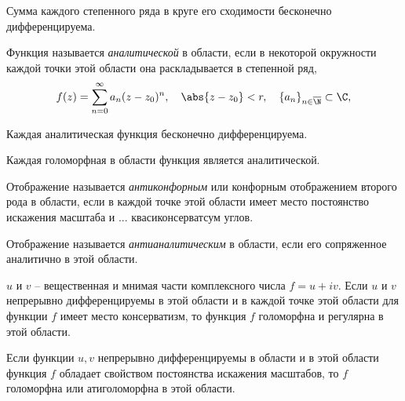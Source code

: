 \begin{corollary}
	Сумма каждого степенного ряда в круге его сходимости бесконечно дифференцируема.
\end{corollary}

\begin{definition}
	Функция называется \emph{аналитической} в области, если в некоторой окружности каждой точки этой области она раскладывается в степенной ряд,
	\[
		f(z) = \sum_{n=0}^{\infty } a_n(z - z_0)^n, \quad \abs{z-z_0} < r, \quad \{a_n\}_{n \in \overline{\N} } \subset \C,
	\]
	\begin{figure}[H]
		\centering
		\label{fig:fig-12}
	\end{figure}
\end{definition}

\begin{corollary}
	Каждая аналитическая функция бесконечно дифференцируема.
\end{corollary}

\begin{remark}
	Каждая голоморфная в области функция является аналитической.
\end{remark}

\begin{definition}
	Отображение называется \emph{антиконфорным} или конфорным отображением второго рода в области, если в каждой точке этой области имеет место постоянство искажения масштаба и ... квасиконсерватсум углов.
\end{definition}

\begin{definition}
	Отображение называется \emph{антианалитическим} в области, если его сопряженное аналитично в этой области.
\end{definition}

\begin{theorem}
	$u$ и $v$ -- вещественная и мнимая части комплексного числа $f=u+iv$. Если $u$ и $v$ непрерывно дифференцируемы в этой области и в каждой точке этой области для функции $f$ имеет место консерватизм, то функция $f$ голоморфна и регулярна в этой области.
\end{theorem}

\begin{theorem}
	Если функции $u,v$ непрерывно дифференцируемы в области и в этой области функция $f$ обладает свойством постоянства искажения масштабов, то $f$ голоморфна или атиголоморфна в этой области.
\end{theorem}

